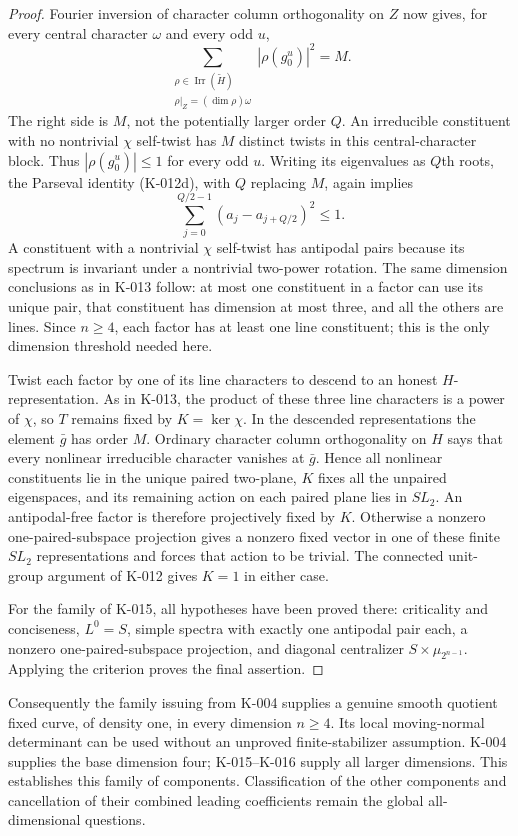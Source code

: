 \begin{proof}
Fourier inversion of character column orthogonality on $Z$ now
gives, for every central character $\omega$ and every odd $u$,
\[
 \sum_{\substack{\rho\in\operatorname{Irr}(\widetilde H)\\
                    \rho|_Z=(\dim\rho)\omega}}
                             |\rho(g_0^u)|^2=M.             \tag{K-016c}
\]
The right side is $M$, not the potentially larger order $Q$.
An irreducible constituent with no nontrivial $\chi$ self-twist
has $M$ distinct twists in this central-character block.  Thus
$|\rho(g_0^u)|\le1$ for every odd $u$.
Writing its eigenvalues as $Q$th roots, the Parseval identity
(K-012d), with $Q$ replacing $M$, again implies
\[
             \sum_{j=0}^{Q/2-1}(a_j-a_{j+Q/2})^2\le1.
\]
A constituent with a nontrivial $\chi$ self-twist has antipodal
pairs because its spectrum is invariant under a nontrivial
two-power rotation.  The same dimension conclusions as in K-013
follow: at most one constituent in a factor can use its unique
pair, that constituent has dimension at most three, and all the
others are lines.  Since $n\ge4$, each factor has at least one
line constituent; this is the only dimension threshold needed here.

Twist each factor by one of its line characters to descend to an
honest $H$-representation.  As in K-013, the product of these three
line characters is a power of $\chi$, so $T$ remains fixed by
$K=\ker\chi$.  In the descended representations the element
$\bar g$ has order $M$.  Ordinary character column orthogonality
on $H$ says that every nonlinear irreducible character vanishes
at $\bar g$.  Hence all nonlinear constituents lie in the unique
paired two-plane, $K$ fixes all the unpaired eigenspaces, and its
remaining action on each paired plane lies in $SL_2$.
An antipodal-free factor is therefore projectively fixed by $K$.
Otherwise a nonzero one-paired-subspace projection gives a nonzero
fixed vector in one of these finite $SL_2$ representations and
forces that action to be trivial.  The connected unit-group
argument of K-012 gives $K=1$ in either case.

For the family of K-015, all hypotheses have been proved there:
criticality and conciseness, $L^0=S$, simple spectra with exactly
one antipodal pair each, a nonzero one-paired-subspace projection,
and diagonal centralizer $S\times\mu_{2^{n-1}}$.
Applying the criterion proves the final assertion.
\end{proof}

Consequently the family issuing from K-004 supplies a genuine
smooth quotient fixed curve, of density one, in every dimension
$n\ge4$.  Its local moving-normal determinant can be used without
an unproved finite-stabilizer assumption.  K-004 supplies the base
dimension four; K-015--K-016 supply all larger dimensions.
This establishes this family of components.  Classification of
the other components and cancellation of their combined leading
coefficients remain the global all-dimensional questions.
